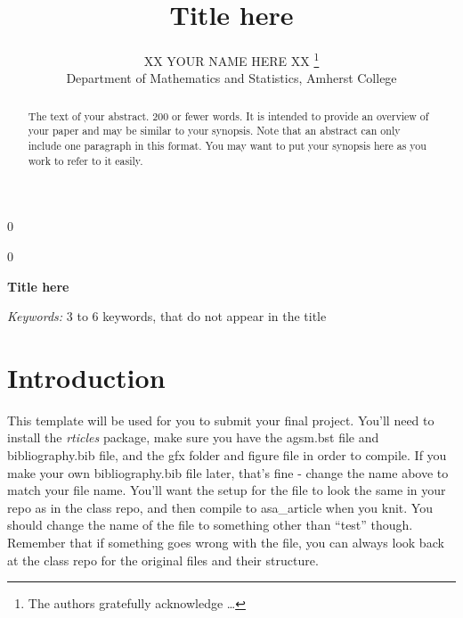 \documentclass[12pt]{article}
\newcommand{\blind}{0}
\begin{document}
\def\spacingset#1{\renewcommand{\baselinestretch}%
{#1}\small\normalsize} \spacingset{1}



\blind
{
  \title{\bf Title here}

  \author{
        XX YOUR NAME HERE XX \thanks{The authors gratefully acknowledge
\ldots{}} \\
    Department of Mathematics and Statistics, Amherst College\\
      }
  \maketitle
} \fi

\blind
{
  \bigskip
  \bigskip
  \bigskip
  \begin{center}
    {\LARGE\bf Title here}
  \end{center}
  \medskip
} \fi

\bigskip
\begin{abstract}
The text of your abstract. 200 or fewer words. It is intended to provide
an overview of your paper and may be similar to your synopsis. Note that
an abstract can only include one paragraph in this format. You may want
to put your synopsis here as you work to refer to it easily.
\end{abstract}

\noindent%
{\it Keywords:} 3 to 6 keywords, that do not appear in the title
\vfill

\newpage
\spacingset{1.45} %

\hypertarget{introduction}{%
\section{Introduction}\label{introduction}}

This template will be used for you to submit your final project. You'll
need to install the \emph{rticles} package, make sure you have the
agsm.bst file and bibliography.bib file, and the gfx folder and figure
file in order to compile. If you make your own bibliography.bib file
later, that's fine - change the name above to match your file name.
You'll want the setup for the file to look the same in your repo as in
the class repo, and then compile to asa\_article when you knit. You
should change the name of the file to something other than ``test''
though. Remember that if something goes wrong with the file, you can
always look back at the class repo for the original files and their
structure.
\end{document}
